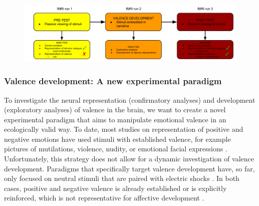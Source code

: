 \documentclass[12pt,a4paper]{article}\usepackage[]{graphicx}\usepackage[]{color}
\begin{document}
\begin{figure}[h]
\centering
\includegraphics[scale=.32]{runs_exp}
\end{figure}

\subsubsection{Valence development: A new experimental paradigm}
To investigate the neural representation (confirmatory analyses) and development (exploratory analyses) of valence in the brain, we want to create a novel experimental paradigm that aims to manipulate emotional valence in an ecologically valid way. To date, most studies on representation of positive and negative emotions have used stimuli with established valence, for example pictures of mutilations, violence, nudity, or emotional facial expressions \citep{lang1999,goeleven2008,KDEF}. Unfortunately, this strategy does not allow for a dynamic investigation of valence development. Paradigms that specifically target valence development have, so far, only focused on neutral stimuli that are paired with electric shocks \citep{visser2013,padmala2008}. In both cases, positive and negative valence is already established or is explicitly reinforced, which is not representative for affective development \citep{barrett2011}.
\end{document}
